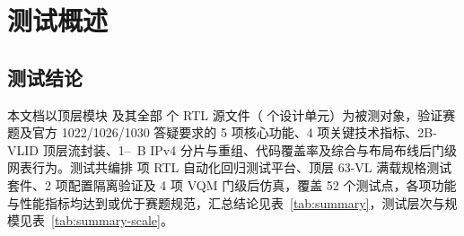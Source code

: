 \chapter{测试概述}\label{ch:overview}

\section{测试结论}

本文档以顶层模块  及其全部 \RtlFileCount{} 个 RTL 源文件（\DesignUnitCount{} 个设计单元）为被测对象，验证赛题及官方 1022/1026/1030 答疑要求的 5 项核心功能、4 项关键技术指标、2B-VLID 顶层流封装、1--\MaxMessageBytes{}~B IPv4 分片与重组、代码覆盖率及综合与布局布线后门级网表行为。测试共编排 \RegCount{} 项 RTL 自动化回归测试平台、顶层 63-VL 满载规格测试套件、2 项配置隔离验证及 4 项 VQM 门级后仿真，覆盖 52 个测试点，各项功能与性能指标均达到或优于赛题规范，汇总结论见表~\ref{tab:summary}，测试层次与规模见表~\ref{tab:summary-scale}。

